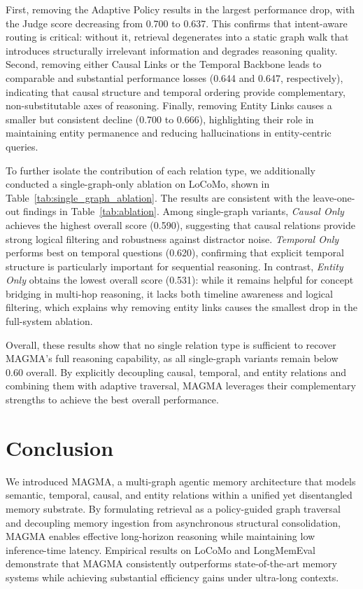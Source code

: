\documentclass[11pt]{article}
\begin{document}
First, removing the Adaptive Policy results in the largest performance drop, with the Judge score decreasing from 0.700 to 0.637. This confirms that intent-aware routing is critical: without it, retrieval degenerates into a static graph walk that introduces structurally irrelevant information and degrades reasoning quality. Second, removing either Causal Links or the Temporal Backbone leads to comparable and substantial performance losses (0.644 and 0.647, respectively), indicating that causal structure and temporal ordering provide complementary, non-substitutable axes of reasoning. Finally, removing Entity Links causes a smaller but consistent decline (0.700 to 0.666), highlighting their role in maintaining entity permanence and reducing hallucinations in entity-centric queries.


To further isolate the contribution of each relation type, we additionally conducted a single-graph-only ablation on LoCoMo, shown in Table~\ref{tab:single_graph_ablation}. The results are consistent with the leave-one-out findings in Table~\ref{tab:ablation}. Among single-graph variants, \textit{Causal Only} achieves the highest overall score (0.590), suggesting that causal relations provide strong logical filtering and robustness against distractor noise. \textit{Temporal Only} performs best on temporal questions (0.620), confirming that explicit temporal structure is particularly important for sequential reasoning. In contrast, \textit{Entity Only} obtains the lowest overall score (0.531): while it remains helpful for concept bridging in multi-hop reasoning, it lacks both timeline awareness and logical filtering, which explains why removing entity links causes the smallest drop in the full-system ablation.

Overall, these results show that no single relation type is sufficient to recover MAGMA's full reasoning capability, as all single-graph variants remain below 0.60 overall. By explicitly decoupling causal, temporal, and entity relations and combining them with adaptive traversal, MAGMA leverages their complementary strengths to achieve the best overall performance.


\section{Conclusion}
\label{conclusion}
We introduced MAGMA, a multi-graph agentic memory architecture that models semantic, temporal, causal, and entity relations within a unified yet disentangled memory substrate. By formulating retrieval as a policy-guided graph traversal and decoupling memory ingestion from asynchronous structural consolidation, MAGMA enables effective long-horizon reasoning while maintaining low inference-time latency. Empirical results on LoCoMo and LongMemEval demonstrate that MAGMA consistently outperforms state-of-the-art memory systems while achieving substantial efficiency gains under ultra-long contexts.
\end{document}
